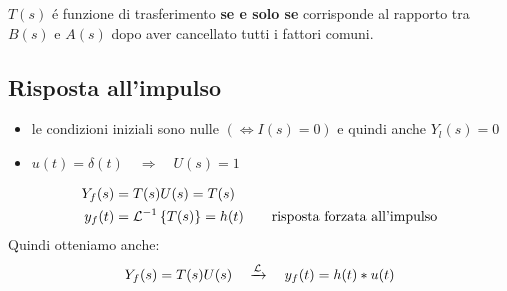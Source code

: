 \documentclass[../main.tex]{subfiles}
\begin{document}
		\begin{definition}
			$ T(s) $ \'{e} funzione di trasferimento \textbf{se e solo se} corrisponde al rapporto tra $ B(s) $ e $ A(s) $ dopo aver cancellato tutti i fattori comuni.
		\end{definition}
	
	\subsection{Risposta all'impulso}
		\begin{itemize}
			\item 
				le condizioni iniziali sono nulle $ (\Leftrightarrow I(s) = 0 ) $ e quindi anche $ Y_l(s) = 0 $
			\item 
				$ u(t) = \delta(t) \quad \Rightarrow \quad U(s) = 1 $
		\end{itemize}
		\begin{align*}
			Y_f(s) &= T(s)U(s) = T(s)
			\\
			y_f(t) &= \mathcal{L}^{-1} \left\lbrace T(s) \right\rbrace = h(t) \qquad \text{risposta forzata all'impulso}
		\end{align*}
		Quindi otteniamo anche:
		\[ 
			Y_f(s) = T(s)U(s) \quad \xrightarrow{\mathcal{L}} \quad y_f(t) = h(t) * u(t)
		\]
	
\end{document}
